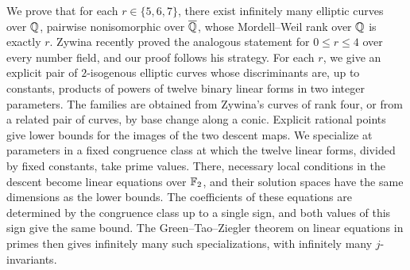 We prove that for each $r\in\{5,6,7\}$, there exist infinitely many elliptic curves over $\mathbb Q$, pairwise nonisomorphic over $\overline{\mathbb Q}$, whose Mordell--Weil rank over $\mathbb Q$ is exactly $r$. Zywina recently proved the analogous statement for $0\le r\le 4$ over every number field, and our proof follows his strategy. For each $r$, we give an explicit pair of $2$-isogenous elliptic curves whose discriminants are, up to constants, products of powers of twelve binary linear forms in two integer parameters. The families are obtained from Zywina's curves of rank four, or from a related pair of curves, by base change along a conic. Explicit rational points give lower bounds for the images of the two descent maps. We specialize at parameters in a fixed congruence class at which the twelve linear forms, divided by fixed constants, take prime values. There, necessary local conditions in the descent become linear equations over $\mathbb F_2$, and their solution spaces have the same dimensions as the lower bounds. The coefficients of these equations are determined by the congruence class up to a single sign, and both values of this sign give the same bound. The Green--Tao--Ziegler theorem on linear equations in primes then gives infinitely many such specializations, with infinitely many $j$-invariants.
